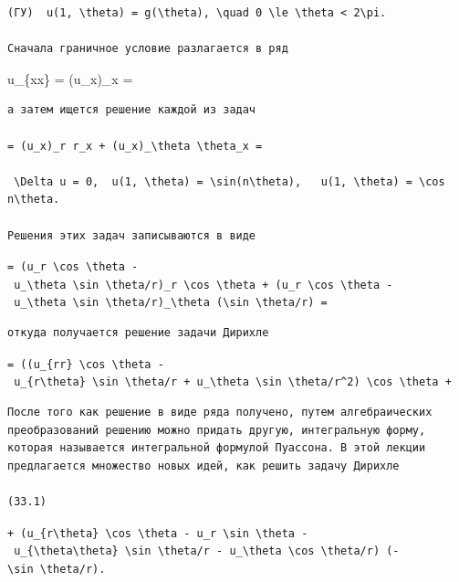 \documentclass[
  ukrainian,
]{article}
\begin{document}
\begin{verbatim}
(ГУ)  u(1, \theta) = g(\theta), \quad 0 \le \theta < 2\pi. 

Сначала граничное условие разлагается в ряд
\end{verbatim}

u\_\{xx\} = (u\_x)\_x =

\begin{verbatim}
а затем ищется решение каждой из задач

= (u_x)_r r_x + (u_x)_\theta \theta_x =

 \Delta u = 0,  u(1, \theta) = \sin(n\theta),   u(1, \theta) = \cos n\theta. 

Решения этих задач записываются в виде
\end{verbatim}

\texttt{=\ (u\_r\ \textbackslash{}cos\ \textbackslash{}theta\ -\ u\_\textbackslash{}theta\ \textbackslash{}sin\ \textbackslash{}theta/r)\_r\ \textbackslash{}cos\ \textbackslash{}theta\ +\ (u\_r\ \textbackslash{}cos\ \textbackslash{}theta\ -\ u\_\textbackslash{}theta\ \textbackslash{}sin\ \textbackslash{}theta/r)\_\textbackslash{}theta\ (\textbackslash{}sin\ \textbackslash{}theta/r)\ =}

\begin{verbatim}
откуда получается решение задачи Дирихле
\end{verbatim}

\texttt{=\ ((u\_\{rr\}\ \textbackslash{}cos\ \textbackslash{}theta\ -\ u\_\{r\textbackslash{}theta\}\ \textbackslash{}sin\ \textbackslash{}theta/r\ +\ u\_\textbackslash{}theta\ \textbackslash{}sin\ \textbackslash{}theta/r\^{}2)\ \textbackslash{}cos\ \textbackslash{}theta\ +}

\begin{verbatim}
После того как решение в виде ряда получено, путем алгебраических преобразований решению можно придать другую, интегральную форму, которая называется интегральной формулой Пуассона. В этой лекции предлагается множество новых идей, как решить задачу Дирихле

(33.1)
\end{verbatim}

\texttt{+\ (u\_\{r\textbackslash{}theta\}\ \textbackslash{}cos\ \textbackslash{}theta\ -\ u\_r\ \textbackslash{}sin\ \textbackslash{}theta\ -\ u\_\{\textbackslash{}theta\textbackslash{}theta\}\ \textbackslash{}sin\ \textbackslash{}theta/r\ -\ u\_\textbackslash{}theta\ \textbackslash{}cos\ \textbackslash{}theta/r)\ (-\textbackslash{}sin\ \textbackslash{}theta/r).}
\end{document}
